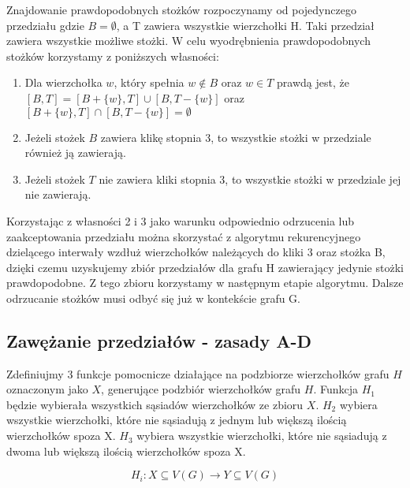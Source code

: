 Znajdowanie prawdopodobnych stożków rozpoczynamy od pojedynczego przedziału gdzie $B = \emptyset$, a T zawiera wszystkie wierzchołki H. Taki przedział zawiera wszystkie możliwe stożki. W celu wyodrębnienia prawdopodobnych stożków korzystamy z poniższych własności:
\begin{enumerate}
\item Dla wierzchołka $w$, który spełnia $w \notin B$ oraz $w\in T$ prawdą jest, że $[B, T] = [B + \{ w\}, T] \cup [B , T - \{ w\}]$ oraz $[B +\{ w\}, T] \cap [B , T - \{ w\}] = \emptyset$

\item Jeżeli stożek $B$ zawiera klikę stopnia 3, to wszystkie stożki w przedziale również ją zawierają. 

\item Jeżeli stożek $T$ nie zawiera kliki stopnia 3, to wszystkie stożki w przedziale jej nie zawierają.
\end{enumerate}

Korzystając z własności 2 i 3 jako warunku odpowiednio odrzucenia lub zaakceptowania przedziału można skorzystać z algorytmu rekurencyjnego dzielącego interwały wzdłuż wierzchołków należących do kliki 3 oraz stożka B, dzięki czemu uzyskujemy zbiór przedziałów dla grafu H zawierający jedynie stożki prawdopodobne. Z tego zbioru korzystamy w następnym etapie algorytmu.
Dalsze odrzucanie stożków musi odbyć się już w kontekście grafu G.
  

\subsection{Zawężanie przedziałów - zasady A-D}
Zdefiniujmy 3 funkcje pomocnicze działające na podzbiorze wierzchołków grafu $H$ oznaczonym jako $X$, generujące podzbiór wierzchołków grafu $H$. 
Funkcja $H_1$ będzie wybierała wszystkich sąsiadów wierzchołków ze zbioru $X$.
$H_2$ wybiera wszystkie wierzchołki, które nie sąsiadują z jednym lub większą ilością wierzchołków spoza X. 
$H_3$ wybiera wszystkie wierzchołki, które nie sąsiadują z dwoma lub większą ilością wierzchołków spoza X.

$$H_i: X \subseteq V(G) \to Y \subseteq V(G)$$

